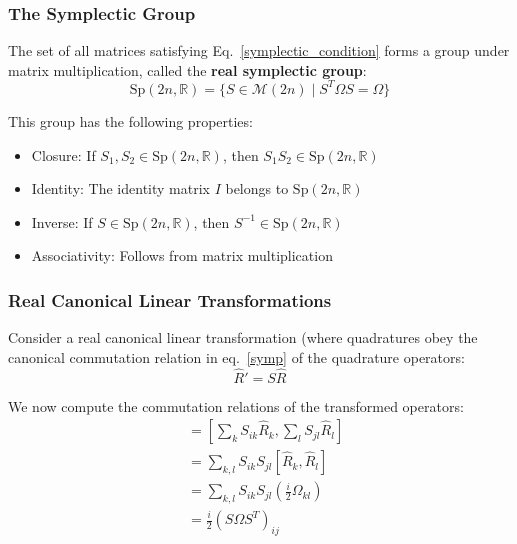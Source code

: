 \subsubsection{The Symplectic Group}

The set of all matrices satisfying Eq.~\eqref{symplectic_condition} forms a group under matrix multiplication, called the \textbf{real symplectic group}:
\begin{equation*}
\mathrm{Sp}(2n, \mathbb{R}) = \{ S \in \mathcal{M}(2n) \mid S^T \Omega S = \Omega \}
\end{equation*}

This group has the following properties:
\begin{itemize}
\item Closure: If $S_1, S_2 \in \mathrm{Sp}(2n,\mathbb{R})$, then $S_1 S_2 \in \mathrm{Sp}(2n,\mathbb{R})$
\item Identity: The identity matrix $I$ belongs to $\mathrm{Sp}(2n,\mathbb{R})$
\item Inverse: If $S \in \mathrm{Sp}(2n,\mathbb{R})$, then $S^{-1} \in \mathrm{Sp}(2n,\mathbb{R})$
\item Associativity: Follows from matrix multiplication
\end{itemize}

\vspace{0.5em}

\subsubsection{Real Canonical Linear Transformations}

Consider a real canonical linear transformation (where quadratures obey the canonical commutation relation in eq.~\eqref{symp} of the quadrature operators:
\begin{equation}
\hat{R}' = S \hat{R}
\end{equation}

We now compute the commutation relations of the transformed operators:
\begin{align*}
[\hat{R}'_i, \hat{R}'_j]
&= \left[ \sum_k S_{ik} \hat{R}_k , \sum_l S_{jl} \hat{R}_l \right] \\
&= \sum_{k,l} S_{ik} S_{jl} [\hat{R}_k, \hat{R}_l] \\
&= \sum_{k,l} S_{ik} S_{jl} \left( \frac{i}{2} \Omega_{kl} \right) \\
&= \frac{i}{2} (S \Omega S^T)_{ij}
\end{align*}


